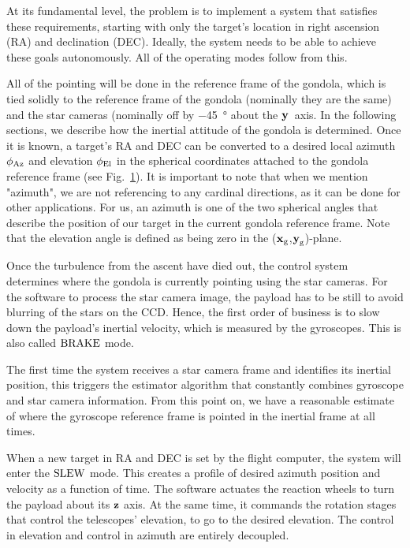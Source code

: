 At its fundamental level, the problem is to implement a system that satisfies these requirements, starting with only the target's location in right ascension (RA) and declination (DEC). Ideally, the system needs to be able to achieve these goals autonomously. All of the operating modes follow from this.

All of the pointing will be done in the reference frame of the gondola, which is tied solidly to the reference frame of the gondola (nominally they are the same) and the star cameras (nominally off by \SI{-45}{\degree} about the $\textrm{\textbf{y}}$~axis. In the following sections, we describe how the inertial attitude of the gondola is determined. Once it is known, a target's RA and DEC can be converted to a desired local azimuth $\phi_\textrm{Az}$ and elevation $\phi_\textrm{El}$ in the spherical coordinates attached to the gondola reference frame (see Fig.~\ref{fig:AzEl}). It is important to note that when we mention "azimuth", we are not referencing to any cardinal directions, as it can be done for other applications. For us, an azimuth is one of the two spherical angles that describe the position of our target in the current gondola reference frame. Note that the elevation angle is defined as being zero in the ($\textrm{\textbf{x}}_{\textrm{g}}$,$\textrm{\textbf{y}}_{\textrm{g}}$)-plane.

\begin{figure}[!ht]
	\centering
	
	\caption[Azimuth and elevation of a target]{}
	\label{fig:AzEl}
    \end{figure}


Once the turbulence from the ascent have died out, the control system determines where the gondola is currently pointing using the star cameras. For the software to process the star camera image, the payload has to be still to avoid blurring of the stars on the CCD. Hence, the first order of business is to slow down the payload's inertial velocity, which is measured by the gyroscopes. This is also called $\textrm{BRAKE}$ mode.

The first time the system receives a star camera frame and identifies its inertial position, this triggers the estimator algorithm that constantly combines gyroscope and star camera information. From this point on, we have a reasonable estimate of where the gyroscope reference frame is pointed in the inertial frame at all times. 

When a new target in RA and DEC is set by the flight computer, the system will enter the $\textrm{SLEW}$ mode. This creates a profile of desired azimuth position and velocity as a function of time. The software actuates the reaction wheels to turn the payload about its $\textrm{\textbf{z}}$ axis. At the same time, it commands the rotation stages that control the telescopes' elevation, to go to the desired elevation. The control in elevation and control in azimuth are entirely decoupled.

